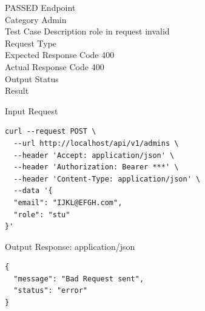\begin{testcase}{31}{PASSED}
Endpoint \hfill {}\\
Category \hfill Admin\\
Test Case Description \hfill role in request invalid\\

Request Type    \hfill {}\\
Expected Response Code    \hfill 400\\
Actual Response Code    \hfill 400\\

Output Status \hfill {}\\
Result \hfill {}

\begin{ipblock}{Input Request}
\begin{verbatim}
curl --request POST \
  --url http://localhost/api/v1/admins \
  --header 'Accept: application/json' \
  --header 'Authorization: Bearer ***' \
  --header 'Content-Type: application/json' \
  --data '{
  "email": "IJKL@EFGH.com",
  "role": "stu"
}'
\end{verbatim}
\end{ipblock}

\begin{opblock}{Output Response: application/json}
\begin{verbatim}
{
  "message": "Bad Request sent",
  "status": "error"
}
\end{verbatim}
\end{opblock}
\end{testcase}

